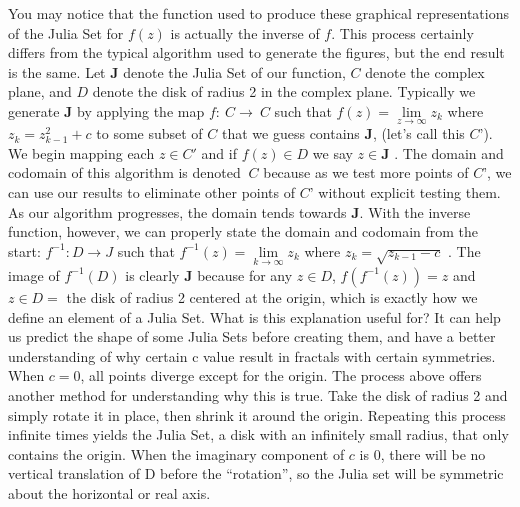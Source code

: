 \documentclass[12pt]{article}
\begin{document}
You may notice that the function used to produce these graphical representations of the Julia Set for $f(z)$ is actually the inverse of $f$. This process certainly differs from the typical algorithm used to generate the figures, but the end result is the same. 
Let $\mathbf{J}$ denote the Julia Set of our function, $C$ denote the complex plane, and $D$ denote the disk of radius 2 in the complex plane. Typically we generate $\mathbf{J}$ by applying the map $f:~C\rightarrow~C$ such that $f(z)=\lim\limits_{z\rightarrow\infty}z_k$ where $z_k=z^2_{k-1}+c$  to some subset of $C$ that we guess contains $\mathbf{J}$, (let’s call this $C’$). We begin mapping each $z\in C'$ and if $f(z)\in D$  we say $z\in\mathbf{J}$ . The domain and codomain of this algorithm is denoted $~C$ because as we test more points of $C’$, we can use our results to eliminate other points of $C’$ without explicit testing them. As our algorithm progresses, the domain tends towards $\mathbf{J}$. With the inverse function, however, we can properly state the domain and codomain from the start: $f^{-1}:D\rightarrow J$ such that $f^{-1}(z)=\lim\limits_{k\rightarrow\infty}z_k$ where $z_k=\sqrt{z_{k-1}-c}$ . The image of $f^{-1}(D)$ is clearly $\mathbf{J}$ because for any $z\in D$, $f(f^{-1}(z))=z$ and $z\in D=$ the disk of radius 2 centered at the origin, which is exactly how we define an element of a Julia Set.
What is this explanation useful for? It can help us predict the shape of some Julia Sets before creating them, and have a better understanding of why certain c value result in fractals with certain symmetries. 
When $c=0$, all points diverge except for the origin. The process above offers another method for understanding why this is true. Take the disk of radius 2 and simply rotate it in place, then shrink it around the origin. Repeating this process infinite times yields the Julia Set, a disk with an infinitely small radius, that only contains the origin.
When the imaginary component of $c$ is 0, there will be no vertical translation of D before the “rotation”, so the Julia set will be symmetric about the horizontal or real axis.
\end{document}
